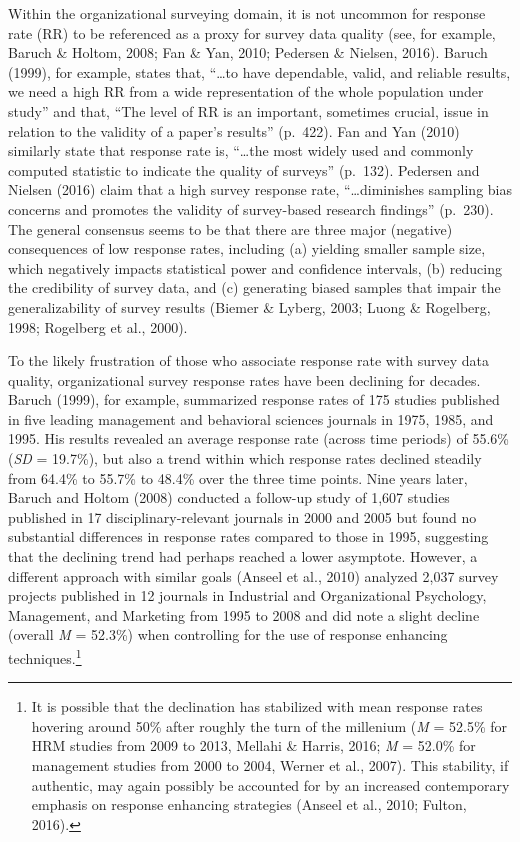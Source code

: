 \documentclass[
  man,floatsintext]{apa7}
\begin{document}
Within the organizational surveying domain, it is not uncommon for response rate (RR) to be referenced as a proxy for survey data quality (see, for example, Baruch \& Holtom, 2008; Fan \& Yan, 2010; Pedersen \& Nielsen, 2016). Baruch (1999), for example, states that, ``\ldots to have dependable, valid, and reliable results, we need a high RR from a wide representation of the whole population under study'' and that, ``The level of RR is an important, sometimes crucial, issue in relation to the validity of a paper's results'' (p.~422). Fan and Yan (2010) similarly state that response rate is, ``\ldots the most widely used and commonly computed statistic to indicate the quality of surveys'' (p.~132). Pedersen and Nielsen (2016) claim that a high survey response rate, ``\ldots diminishes sampling bias concerns and promotes the validity of survey-based research findings'' (p.~230). The general consensus seems to be that there are three major (negative) consequences of low response rates, including (a) yielding smaller sample size, which negatively impacts statistical power and confidence intervals, (b) reducing the credibility of survey data, and (c) generating biased samples that impair the generalizability of survey results (Biemer \& Lyberg, 2003; Luong \& Rogelberg, 1998; Rogelberg et al., 2000).

To the likely frustration of those who associate response rate with survey data quality, organizational survey response rates have been declining for decades. Baruch (1999), for example, summarized response rates of 175 studies published in five leading management and behavioral sciences journals in 1975, 1985, and 1995. His results revealed an average response rate (across time periods) of 55.6\% (\emph{SD} = 19.7\%), but also a trend within which response rates declined steadily from 64.4\% to 55.7\% to 48.4\% over the three time points. Nine years later, Baruch and Holtom (2008) conducted a follow-up study of 1,607 studies published in 17 disciplinary-relevant journals in 2000 and 2005 but found no substantial differences in response rates compared to those in 1995, suggesting that the declining trend had perhaps reached a lower asymptote. However, a different approach with similar goals (Anseel et al., 2010) analyzed 2,037 survey projects published in 12 journals in Industrial and Organizational Psychology, Management, and Marketing from 1995 to 2008 and did note a slight decline (overall \emph{M} = 52.3\%) when controlling for the use of response enhancing techniques.\footnote{It is possible that the declination has stabilized with mean response rates hovering around 50\% after roughly the turn of the millenium (\emph{M} = 52.5\% for HRM studies from 2009 to 2013, Mellahi \& Harris, 2016; \emph{M} = 52.0\% for management studies from 2000 to 2004, Werner et al., 2007). This stability, if authentic, may again possibly be accounted for by an increased contemporary emphasis on response enhancing strategies (Anseel et al., 2010; Fulton, 2016).}
\end{document}
